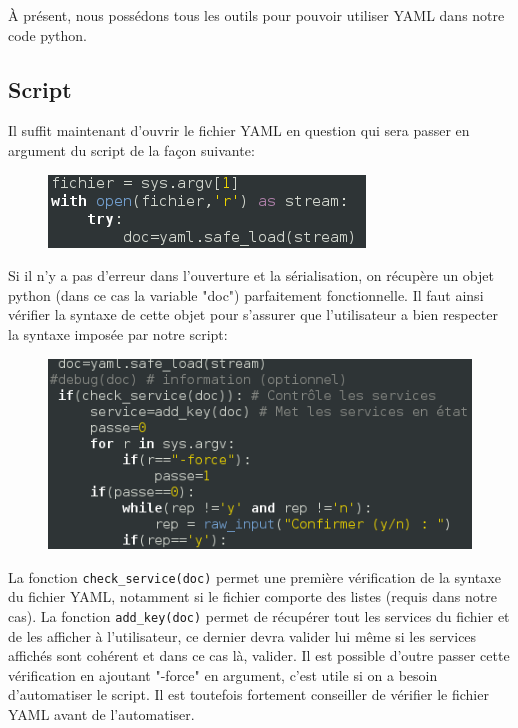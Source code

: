 \documentclass[a4paper,11pt]{article}
\begin{document}
À présent, nous possédons tous les outils pour pouvoir utiliser YAML dans notre code python.

\subsection{Script}
\label{sub:4.4}
\noindent
Il suffit maintenant d'ouvrir le fichier YAML en question qui sera passer en argument du script de la façon suivante:
\smallbreak
\begin{figure}[hbtp]
\centering
\includegraphics[scale=0.7]{recup_yaml.png}
\end{figure}
\smallbreak
\noindent
Si il n'y a pas d'erreur dans l'ouverture et la sérialisation, on récupère un objet python (dans ce cas la variable "doc") parfaitement fonctionnelle. 
\smallbreak
\noindent
Il faut ainsi vérifier la syntaxe de cette objet pour s'assurer que l'utilisateur a bien respecter la syntaxe imposée par notre script:

\smallbreak
\begin{figure}[hbtp]
\centering
\includegraphics[scale=0.7]{controle_yaml.png}
\end{figure}
\smallbreak
\noindent
La fonction \verb?check_service(doc)? permet une première vérification de la syntaxe du fichier YAML, notamment si le fichier comporte des listes (requis dans notre cas).
\smallbreak
\noindent
La fonction \verb?add_key(doc)? permet de récupérer tout les services du fichier et de les afficher à l'utilisateur, ce dernier devra valider lui même si les services affichés sont cohérent et dans ce cas là, valider. Il est possible d'outre passer cette vérification en ajoutant "-force" en argument, c'est utile si on a besoin d'automatiser le script. Il est toutefois fortement conseiller de vérifier le fichier YAML avant de l'automatiser. 
\end{document}
